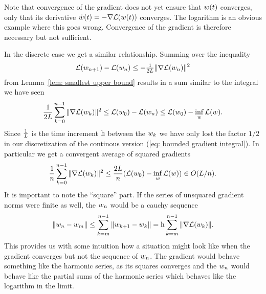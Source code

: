 Note that convergence of the gradient does not yet ensure that \(w(t)\)
converges, only that its derivative \(\dot{w}(t) = -\nabla \mathcal{L}(w(t))\)
converges. The logarithm is an obvious example where this goes wrong.
Convergence of the gradient is therefore necessary but not sufficient.

In the discrete case we get a similar relationship. Summing over the inequality 
\begin{align*}
	\mathcal{L}(w_{n+1}) - \mathcal{L}(w_n) \le -\tfrac{1}{2L}\|\nabla\mathcal{L}(w_n)\|^2
\end{align*}
from Lemma~\ref{lem: smallest upper bound} results in a sum similar to the
integral we have seen
\begin{align*}
	\frac{1}{2L} \sum_{k=0}^{n-1}\|\nabla \mathcal{L}(w_k)\|^2
	\le \mathcal{L}(w_0) - \mathcal{L}(w_n)
	\le \mathcal{L}(w_0) - \inf_{w} \mathcal{L}(w).
\end{align*}
%
Since \(\tfrac{1}{L}\) is the time increment \(\text{h}\) between the \(w_k\)
we have only lost the factor \(1/2\) in our discretization of the continous
version (\ref{eq: bounded gradient integral}).
In particular we get a convergent average of squared gradients
%
\begin{align*}
	\frac{1}{n} \sum_{k=0}^{n-1} \|\nabla \mathcal{L}(w_k)\|^2
	\le \frac{2 L}{n} (\mathcal{L}(w_0) - \inf_w \mathcal{L}(w))
	\in O(L/n).
\end{align*}
%
It is important to note the ``square'' part. If the series of unsquared gradient
norms were finite as well, the \(w_n\) would be a cauchy sequence
%
\begin{align*}
	\|w_n - w_m \|
	\le \sum_{k=m}^{n-1} \|w_{k+1} - w_k\|
	= \text{h} \sum_{k=m}^{n-1} \|\nabla \mathcal{L}(w_k)\|.
\end{align*}
%
This provides us with some intuition how a situation might look like when the
gradient converges but not the sequence of \(w_n\). The gradient would
behave something like the harmonic series, as its squares converges and the
\(w_n\) would behave like the partial sums of the harmonic series which
behaves like the logarithm in the limit.

